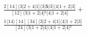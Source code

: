 \documentclass[varwidth, border=5pt]{standalone}
\begin{document}
\begin{my}
$\begin{gathered}
\scriptscriptstyle\frac{2[14]⟨3|2+4|1]⟨3|𝟓|3]⟨4|1+2|3]}{[12]⟨3|1+2|4]²⟨4|1+2|4]} +\\
\scriptscriptstyle\frac{1⟨14⟩[14][34]⟨3|2+4|1]⟨4|1+2|3]}{[24]⟨3|1+2|4]⟨4|1+2|4]²} \phantom{+}
\end{gathered}$
\end{my}
\end{document}
